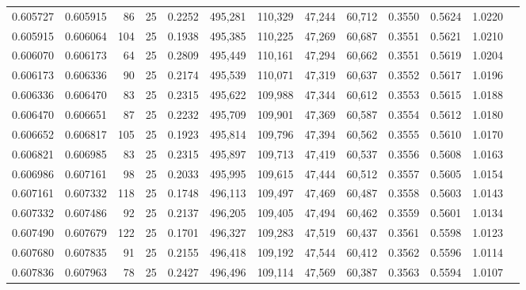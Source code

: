 \begin{tabular}{rrrrrrrrrrrrr}
0.605727 & 0.605915 &    86 &  25 &                                     0.2252 & 495,281 & 110,329 &  47,244 &  60,712 & 0.3550 & 0.5624 & 1.0220 \\
0.605915 & 0.606064 &   104 &  25 &                                     0.1938 & 495,385 & 110,225 &  47,269 &  60,687 & 0.3551 & 0.5621 & 1.0210 \\
0.606070 & 0.606173 &    64 &  25 &                                     0.2809 & 495,449 & 110,161 &  47,294 &  60,662 & 0.3551 & 0.5619 & 1.0204 \\
0.606173 & 0.606336 &    90 &  25 &                                     0.2174 & 495,539 & 110,071 &  47,319 &  60,637 & 0.3552 & 0.5617 & 1.0196 \\
0.606336 & 0.606470 &    83 &  25 &                                     0.2315 & 495,622 & 109,988 &  47,344 &  60,612 & 0.3553 & 0.5615 & 1.0188 \\
0.606470 & 0.606651 &    87 &  25 &                                     0.2232 & 495,709 & 109,901 &  47,369 &  60,587 & 0.3554 & 0.5612 & 1.0180 \\
0.606652 & 0.606817 &   105 &  25 &                                     0.1923 & 495,814 & 109,796 &  47,394 &  60,562 & 0.3555 & 0.5610 & 1.0170 \\
0.606821 & 0.606985 &    83 &  25 &                                     0.2315 & 495,897 & 109,713 &  47,419 &  60,537 & 0.3556 & 0.5608 & 1.0163 \\
0.606986 & 0.607161 &    98 &  25 &                                     0.2033 & 495,995 & 109,615 &  47,444 &  60,512 & 0.3557 & 0.5605 & 1.0154 \\
0.607161 & 0.607332 &   118 &  25 &                                     0.1748 & 496,113 & 109,497 &  47,469 &  60,487 & 0.3558 & 0.5603 & 1.0143 \\
0.607332 & 0.607486 &    92 &  25 &                                     0.2137 & 496,205 & 109,405 &  47,494 &  60,462 & 0.3559 & 0.5601 & 1.0134 \\
0.607490 & 0.607679 &   122 &  25 &                                     0.1701 & 496,327 & 109,283 &  47,519 &  60,437 & 0.3561 & 0.5598 & 1.0123 \\
0.607680 & 0.607835 &    91 &  25 &                                     0.2155 & 496,418 & 109,192 &  47,544 &  60,412 & 0.3562 & 0.5596 & 1.0114 \\
0.607836 & 0.607963 &    78 &  25 &                                     0.2427 & 496,496 & 109,114 &  47,569 &  60,387 & 0.3563 & 0.5594 & 1.0107 \\

\end{tabular}
